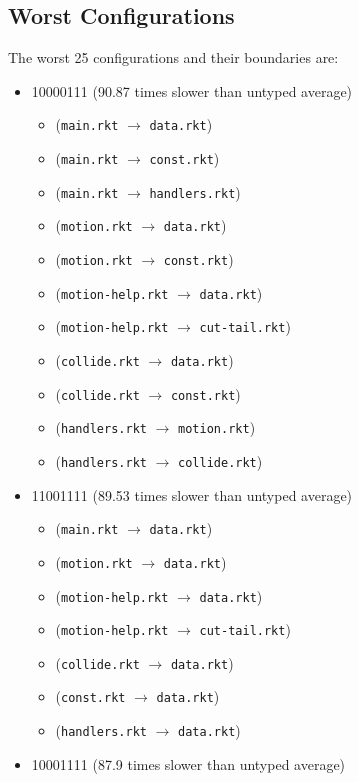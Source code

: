 \documentclass{article}
\newcommand{\mono}[1]{\texttt{#1}}
\begin{document}
\subsection{Worst Configurations}
The worst 25 configurations and their boundaries are:
\begin{itemize}
\item 10000111 (90.87 times slower than untyped average)
  \begin{itemize}
  \item (\mono{main.rkt} $\rightarrow$ \mono{data.rkt})
  \item (\mono{main.rkt} $\rightarrow$ \mono{const.rkt})
  \item (\mono{main.rkt} $\rightarrow$ \mono{handlers.rkt})
  \item (\mono{motion.rkt} $\rightarrow$ \mono{data.rkt})
  \item (\mono{motion.rkt} $\rightarrow$ \mono{const.rkt})
  \item (\mono{motion-help.rkt} $\rightarrow$ \mono{data.rkt})
  \item (\mono{motion-help.rkt} $\rightarrow$ \mono{cut-tail.rkt})
  \item (\mono{collide.rkt} $\rightarrow$ \mono{data.rkt})
  \item (\mono{collide.rkt} $\rightarrow$ \mono{const.rkt})
  \item (\mono{handlers.rkt} $\rightarrow$ \mono{motion.rkt})
  \item (\mono{handlers.rkt} $\rightarrow$ \mono{collide.rkt})
  \end{itemize}
\item 11001111 (89.53 times slower than untyped average)
  \begin{itemize}
  \item (\mono{main.rkt} $\rightarrow$ \mono{data.rkt})
  \item (\mono{motion.rkt} $\rightarrow$ \mono{data.rkt})
  \item (\mono{motion-help.rkt} $\rightarrow$ \mono{data.rkt})
  \item (\mono{motion-help.rkt} $\rightarrow$ \mono{cut-tail.rkt})
  \item (\mono{collide.rkt} $\rightarrow$ \mono{data.rkt})
  \item (\mono{const.rkt} $\rightarrow$ \mono{data.rkt})
  \item (\mono{handlers.rkt} $\rightarrow$ \mono{data.rkt})
  \end{itemize}
\item 10001111 (87.9 times slower than untyped average)

\end{itemize}
\end{document}

